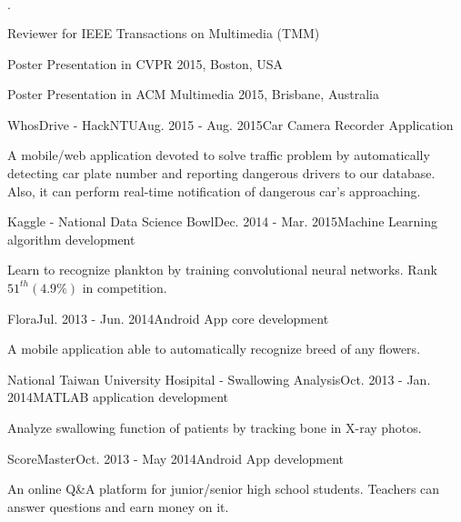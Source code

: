 \documentclass{joel_cv}
\begin{document}

%
%

\begin{sectionItemize}{$\cdot$}
	\item Reviewer for IEEE Transactions on Multimedia (TMM)
	\item Poster Presentation in CVPR 2015, Boston, USA
	\item Poster Presentation in ACM Multimedia 2015, Brisbane, Australia
\end{sectionItemize}

%
%


\begin{sectionContentNormal}{WhosDrive - HackNTU}{Aug. 2015 - Aug. 2015}{Car Camera Recorder Application}
	\item A mobile/web application devoted to solve traffic problem by automatically detecting car plate number and reporting dangerous drivers to our database. Also, it can perform real-time notification of dangerous car's approaching.
\end{sectionContentNormal}

\begin{sectionContentNormal}{Kaggle - National Data Science Bowl}{Dec. 2014 - Mar. 2015}{Machine Learning algorithm development}
	\item Learn to recognize plankton by training convolutional neural networks. Rank $51^{th} (4.9\%)$ in competition.
\end{sectionContentNormal}

\begin{sectionContentNormal}{Flora}{Jul. 2013 - Jun. 2014}{Android App core development}
	\item A mobile application able to automatically recognize breed of any flowers.
\end{sectionContentNormal}

\begin{sectionContentNormal}{National Taiwan University Hosipital - Swallowing Analysis}{Oct. 2013 - Jan. 2014}{MATLAB application development}
	\item Analyze swallowing function of patients by tracking bone in X-ray photos.
\end{sectionContentNormal}

\begin{sectionContentNormal}{ScoreMaster}{Oct. 2013 - May 2014}{Android App development}
	\item An online Q\&A platform for junior/senior high school students. Teachers can answer questions and earn money on it.
\end{sectionContentNormal}
\end{document}
